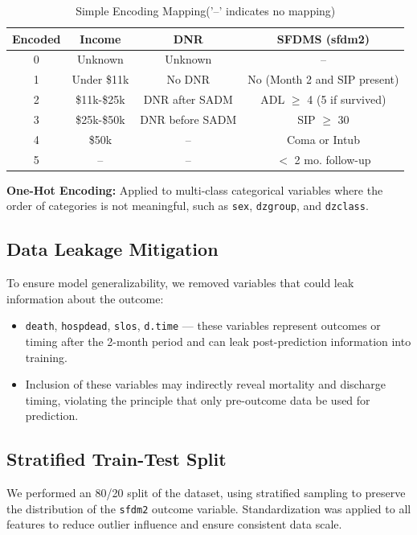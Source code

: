 \begin{table}[H]
    \centering
    \caption{Simple Encoding Mapping('--' indicates no mapping)}
    \label{tab:encoding_mapping}
    \begin{tabular}{|c|c|c|c|}
    \hline
    \textbf{Encoded} & \textbf{Income} & \textbf{DNR} & \textbf{SFDMS (sfdm2)} \\
    \hline
    0 & Unknown & Unknown & -- \\
    1 & Under \$11k & No DNR & No (Month 2 and SIP present) \\
    2 & \$11k-\$25k & DNR after SADM & ADL $\geq$ 4 (5 if survived) \\
    3 & \$25k-\$50k & DNR before SADM & SIP $\geq$ 30 \\
    4 & \>\$50k & -- & Coma or Intub \\
    5 & -- & -- & $<$ 2 mo. follow-up \\
    \hline
    \end{tabular}
\end{table}

\textbf{One-Hot Encoding:} Applied to multi-class categorical variables where 
the order of categories is not meaningful,
such as \texttt{sex}, \texttt{dzgroup}, and \texttt{dzclass}.


\subsection{Data Leakage Mitigation}

To ensure model generalizability, we removed variables that could leak information about the outcome:

\begin{itemize}
    \item \texttt{death}, \texttt{hospdead}, \texttt{slos}, \texttt{d.time} — these variables represent outcomes or timing after the 2-month period and can leak post-prediction information into training.
    \item Inclusion of these variables may indirectly reveal mortality and discharge timing, violating the principle that only pre-outcome data be used for prediction.
\end{itemize}

\subsection{Stratified Train-Test Split}

We performed an 80/20 split of the dataset, using stratified sampling to preserve the distribution of the \texttt{sfdm2} outcome variable.
Standardization was applied to all features to reduce outlier influence and ensure consistent data scale.

